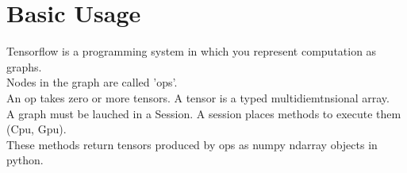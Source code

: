 \documentclass[twocolumn]{article}
\begin{document}
\section{Basic Usage}
Tensorflow is a programming system in which you represent computation as graphs.\\
Nodes in the graph are called 'ops'. \\
An op takes zero or more tensors.
A tensor is a typed multidiemtnsional array. \\
A graph must be lauched in a Session. A session places methods to execute them (Cpu, Gpu). \\
These methods return tensors produced by ops as numpy ndarray objects in python.
\end{document}
